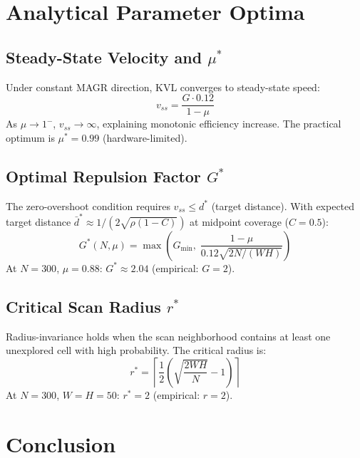 \documentclass[journal,twoside,letterpaper]{IEEEtran}
\begin{document}
\section{Analytical Parameter Optima}

\subsection{Steady-State Velocity and $\mu^*$}

Under constant MAGR direction, KVL converges to steady-state speed:
\begin{equation}
    v_{ss} = \frac{G \cdot 0.12}{1 - \mu}
    \label{eq:vss}
\end{equation}
As $\mu\to1^-$, $v_{ss}\to\infty$, explaining monotonic efficiency increase.
The practical optimum is $\mu^*=0.99$ (hardware-limited).

\subsection{Optimal Repulsion Factor $G^*$}

The zero-overshoot condition requires $v_{ss}\leq d^*$ (target distance).
With expected target distance $\bar{d}^*\approx1/(2\sqrt{\rho(1-C)})$ at
midpoint coverage ($C=0.5$):
\begin{equation}
    G^*(N,\mu) = \max\!\left(G_{\min},\;\frac{1-\mu}{0.12\sqrt{2N/(WH)}}\right)
    \label{eq:gstar}
\end{equation}
At $N=300$, $\mu=0.88$: $G^*\approx2.04$ (empirical: $G=2$). \checkmark

\subsection{Critical Scan Radius $r^*$}

Radius-invariance holds when the scan neighborhood contains at least one
unexplored cell with high probability. The critical radius is:
\begin{equation}
    r^* = \left\lceil\frac{1}{2}\left(\sqrt{\frac{2WH}{N}}-1\right)\right\rceil
    \label{eq:rstar}
\end{equation}
At $N=300$, $W=H=50$: $r^*=2$ (empirical: $r=2$). \checkmark

\section{Conclusion}
\end{document}
